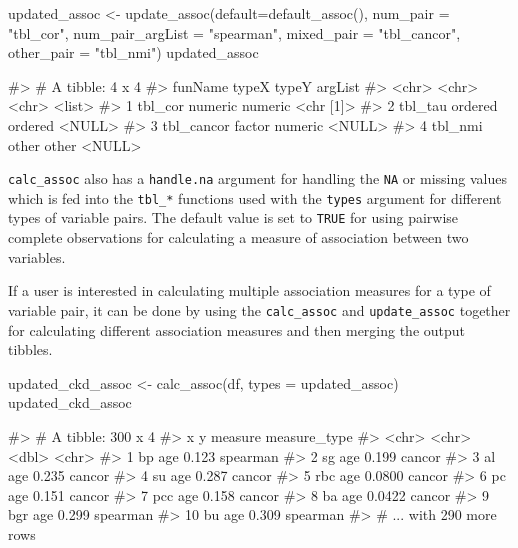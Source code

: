 \begin{Schunk}
\begin{Sinput}
updated_assoc <- update_assoc(default=default_assoc(),
                              num_pair = "tbl_cor",
                              num_pair_argList = "spearman",
                              mixed_pair = "tbl_cancor",
                              other_pair = "tbl_nmi")
updated_assoc
\end{Sinput}
\begin{Soutput}
#> # A tibble: 4 x 4
#>   funName    typeX   typeY   argList  
#>   <chr>      <chr>   <chr>   <list>   
#> 1 tbl_cor    numeric numeric <chr [1]>
#> 2 tbl_tau    ordered ordered <NULL>   
#> 3 tbl_cancor factor  numeric <NULL>   
#> 4 tbl_nmi    other   other   <NULL>
\end{Soutput}
\end{Schunk}

\texttt{calc\_assoc} also has a \texttt{handle.na} argument for handling
the \texttt{NA} or missing values which is fed into the \texttt{tbl\_*}
functions used with the \texttt{types} argument for different types of
variable pairs. The default value is set to \texttt{TRUE} for using
pairwise complete observations for calculating a measure of association
between two variables.

If a user is interested in calculating multiple association measures for
a type of variable pair, it can be done by using the
\texttt{calc\_assoc} and \texttt{update\_assoc} together for calculating
different association measures and then merging the output tibbles.

\begin{Schunk}
\begin{Sinput}
updated_ckd_assoc <- calc_assoc(df, types = updated_assoc)
updated_ckd_assoc
\end{Sinput}
\begin{Soutput}
#> # A tibble: 300 x 4
#>    x     y     measure measure_type
#>    <chr> <chr>   <dbl> <chr>       
#>  1 bp    age    0.123  spearman    
#>  2 sg    age    0.199  cancor      
#>  3 al    age    0.235  cancor      
#>  4 su    age    0.287  cancor      
#>  5 rbc   age    0.0800 cancor      
#>  6 pc    age    0.151  cancor      
#>  7 pcc   age    0.158  cancor      
#>  8 ba    age    0.0422 cancor      
#>  9 bgr   age    0.299  spearman    
#> 10 bu    age    0.309  spearman    
#> # ... with 290 more rows
\end{Soutput}
\end{Schunk}

